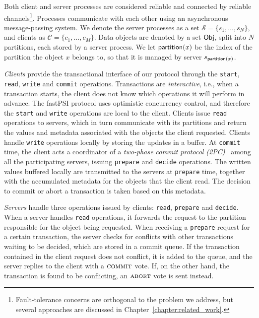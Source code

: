 Both client and server processes are considered reliable and connected by reliable channels\footnote{Fault-tolerance concerns are orthogonal to the problem we address, but several approaches are discussed in Chapter~\ref{chapter:related_work}.}. Processes communicate with each other using an asynchronous message-passing system. We denote the server processes as a set $\mathcal{S} = \{s_1, \dots, s_N\}$, and clients as $\mathcal{C} = \{c_1, \dots, c_M\}$. Data objects are denoted by a set ${\sf Obj}$, split into $N$ partitions, each stored by a server process. We let $\mathsf{partition}(x)$ be the index of the partition the object $x$ belongs to, so that it is managed by server $s_{\mathsf{partition}(x)}$.

\emph{Clients} provide the transactional interface of our protocol through the \texttt{start}, \texttt{read}, \texttt{write} and \texttt{commit} operations. Transactions are \emph{interactive}, i.e., when a transaction starts, the client does not know which operations it will perform in advance. The fastPSI protocol uses optimistic concurrency control, and therefore the \texttt{start} and \texttt{write} operations are local to the client. Clients issue \texttt{read} operations to servers, which in turn communicate with its partitions and return the values and metadata associated with the objects the client requested. Clients handle \texttt{write} operations locally by storing the updates in a buffer. At \texttt{commit} time, the client acts a coordinator of a \emph{two-phase commit protocol (2PC)}~\citep{bernstein_concurrency} among all the participating servers, issuing \texttt{prepare} and \texttt{decide} operations. The written values buffered locally are transmitted to the servers at \texttt{prepare} time, together with the accumulated metadata for the objects that the client read. The decision to commit or abort a transaction is taken based on this metadata.

\emph{Servers} handle three operations issued by clients: \texttt{read}, \texttt{prepare} and \texttt{decide}. When a server handles \texttt{read} operations, it forwards the request to the partition responsible for the object being requested. When receiving a \texttt{prepare} request for a certain transaction, the server checks for conflicts with other transactions waiting to be decided, which are stored in a commit queue. If the transaction contained in the client request does not conflict, it is added to the queue, and the server replies to the client with a $\text{\sc commit}$ vote. If, on the other hand, the transaction is found to be conflicting, an $\text{\sc abort}$ vote is sent instead.

